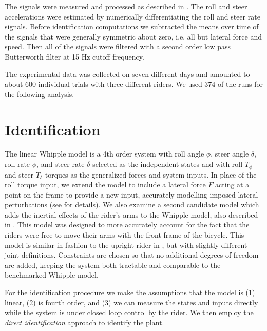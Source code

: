 \documentclass[a4paper]{article}
\begin{document}
The signals were measured and processed as described in \cite{Moore2012}. The
roll and steer accelerations were estimated by numerically differentiating the
roll and steer rate signals. Before identification computations we subtracted
the means over time of the signals that were generally symmetric about zero,
i.e. all but lateral force and speed. Then all of the signals were filtered
with a second order low pass Butterworth filter at 15 Hz cutoff frequency.

The experimental data was collected on seven different days and amounted to
about 600 individual trials with three different riders. We used 374 of the
runs for the following analysis.


\section{Identification}
\label{sec:identification}


The linear Whipple model is a 4th order system with roll angle $\phi$, steer
angle $\delta$, roll rate $\dot{\phi}$, and steer rate $\dot{\delta}$ selected
as the independent states and with roll $T_\phi$ and steer $T_\delta$ torques
as the generalized forces and system inputs. In place of the roll torque input,
we extend the model to include a lateral force $F$ acting at a point on the
frame to provide a new input, accurately modelling imposed lateral
perturbations (see \cite{Moore2012} for details).  We also examine a second
candidate model which adds the inertial effects of the rider's arms to the
Whipple model, also described in \cite{Moore2012}. This model was designed to
more accurately account for the fact that the riders were free to move their
arms with the front frame of the bicycle. This model is similar in fashion to
the upright rider in \cite{Schwab2010}, but with slightly different joint
definitions. Constraints are chosen so that no additional degrees of freedom
are added, keeping the system both tractable and comparable to the benchmarked
Whipple model.

For the identification procedure we make the assumptions that the model is (1)
linear, (2) is fourth order, and (3) we can measure the states and inputs
directly while the system is under closed loop control by the rider. We then
employ the \emph{direct identification} approach to identify the plant.
\end{document}
